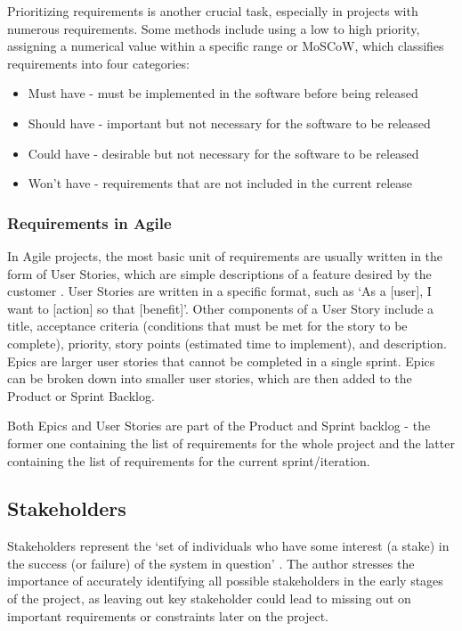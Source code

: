 Prioritizing requirements is another crucial task, especially in projects with numerous requirements. Some methods include using a low to high priority, assigning a numerical value within a specific range or MoSCoW, which classifies requirements into four categories: 
\begin{itemize}
    \item Must have - must be implemented in the software before being released
    \item Should have - important but not necessary for the software to be released
    \item Could have - desirable but not necessary for the software to be released
    \item Won't have - requirements that are not included in the current release
\end{itemize}

\subsubsection{Requirements in Agile}

In Agile projects, the most basic unit of requirements are usually written in the form of User Stories, which are simple descriptions of a feature desired by the customer \parencite[191]{requirements}. User Stories are written in a specific format, such as `As a [user], I want to [action] so that [benefit]'. Other components of a User Story include a title, acceptance criteria (conditions that must be met for the story to be complete), priority, story points (estimated time to implement), and description. Epics are larger user stories that cannot be completed in a single sprint. Epics can be broken down into smaller user stories, which are then added to the Product or Sprint Backlog.

Both Epics and User Stories are part of the Product and Sprint backlog - the former one containing the list of requirements for the whole project and the latter containing the list of requirements for the current sprint/iteration.

\subsection{Stakeholders}
\label{sec:stakeholders}

Stakeholders represent the `set of individuals who have some interest (a stake) in the success (or failure) of the system in question' \parencite[34]{requirements}. The author stresses the importance of accurately identifying all possible stakeholders in the early stages of the project, as leaving out key stakeholder could lead to missing out on important requirements or constraints later on the project. 

